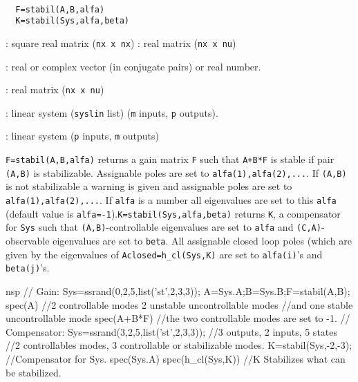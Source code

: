 \begin{mandesc}
   \\ %
\end{mandesc}
\begin{calling_sequence}
\begin{verbatim}
  F=stabil(A,B,alfa)  
  K=stabil(Sys,alfa,beta)  
\end{verbatim}
\end{calling_sequence}
\begin{parameters}
  \begin{varlist}
    : square real matrix (\verb!nx x nx!)
    :  real matrix (\verb!nx x nu!)

    : real or complex vector (in conjugate pairs) or real
    number.

    : real matrix (\verb!nx x nu!)

    : linear system (\verb!syslin! list) (\verb!m! inputs, \verb!p!
    outputs).

    : linear system (\verb!p! inputs, \verb!m! outputs)
  \end{varlist}
\end{parameters}
\begin{mandescription}
  \verb!F=stabil(A,B,alfa)! returns a gain matrix \verb!F! such that
  \verb!A+B*F! is stable if pair \verb!(A,B)! is stabilizable.  Assignable poles
  are set to \verb!alfa(1),alfa(2),...!.  If \verb!(A,B)! is not stabilizable a
  warning is given and assignable poles are set to \verb!alfa(1),alfa(2),...!.
  If \verb!alfa! is a number all eigenvalues are set to this \verb!alfa!
  (default value is \verb!alfa=-1!).\verb!K=stabil(Sys,alfa,beta)! returns
  \verb!K!, a compensator for \verb!Sys!  such that \verb!(A,B)!-controllable
  eigenvalues are set to \verb!alfa! and \verb!(C,A)!-observable eigenvalues are
  set to \verb!beta!.  All assignable closed loop poles (which are given by the
  eigenvalues of \verb!Aclosed=h_cl(Sys,K)! are set to \verb!alfa(i)!'s and
  \verb!beta(j)!'s.
\end{mandescription}
\begin{examples}
  \begin{mintednsp}{nsp}
    // Gain:
    Sys=ssrand(0,2,5,list('st',2,3,3));
    A=Sys.A;B=Sys.B;F=stabil(A,B);
    spec(A) //2 controllable modes 2 unstable uncontrollable modes
    //and one stable uncontrollable mode
    spec(A+B*F) //the two controllable modes are set to -1.
    // Compensator:
    Sys=ssrand(3,2,5,list('st',2,3,3)); //3 outputs, 2 inputs, 5 states
    //2 controllables modes, 3 controllable or stabilizable modes.
    K=stabil(Sys,-2,-3);  //Compensator for Sys.
    spec(Sys.A)
    spec(h_cl(Sys,K))   //K Stabilizes what can be stabilized.
  \end{mintednsp}
\end{examples}
\begin{manseealso}
      
\end{manseealso}
